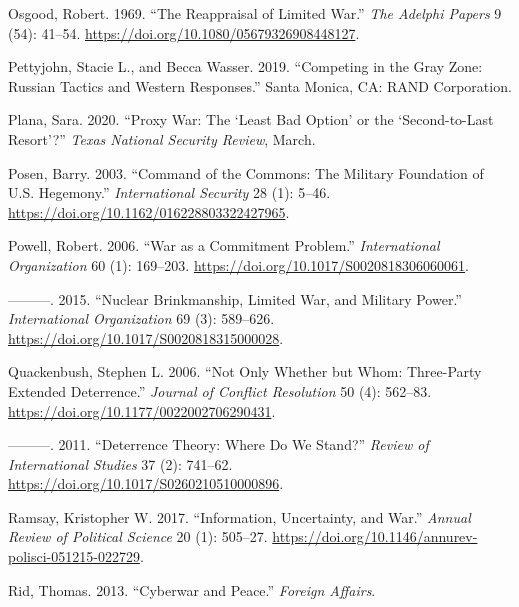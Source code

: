\documentclass[
]{article}
\begin{document}
\leavevmode\hypertarget{ref-osgood_reappraisallimitedwar_1969}{}%
Osgood, Robert. 1969. ``The Reappraisal of Limited War.'' \emph{The Adelphi Papers} 9 (54): 41--54. \url{https://doi.org/10.1080/05679326908448127}.

\leavevmode\hypertarget{ref-pettyjohn_competinggrayzone_2019}{}%
Pettyjohn, Stacie L., and Becca Wasser. 2019. ``Competing in the Gray Zone: Russian Tactics and Western Responses.'' Santa Monica, CA: RAND Corporation.

\leavevmode\hypertarget{ref-plana_proxywarleast_2020}{}%
Plana, Sara. 2020. ``Proxy War: The `Least Bad Option' or the `Second-to-Last Resort'?'' \emph{Texas National Security Review}, March.

\leavevmode\hypertarget{ref-posen_commandcommonsmilitary_2003}{}%
Posen, Barry. 2003. ``Command of the Commons: The Military Foundation of U.S. Hegemony.'' \emph{International Security} 28 (1): 5--46. \url{https://doi.org/10.1162/016228803322427965}.

\leavevmode\hypertarget{ref-powell_warcommitmentproblem_2006}{}%
Powell, Robert. 2006. ``War as a Commitment Problem.'' \emph{International Organization} 60 (1): 169--203. \url{https://doi.org/10.1017/S0020818306060061}.

\leavevmode\hypertarget{ref-powell_nuclearbrinkmanshiplimited_2015}{}%
---------. 2015. ``Nuclear Brinkmanship, Limited War, and Military Power.'' \emph{International Organization} 69 (3): 589--626. \url{https://doi.org/10.1017/S0020818315000028}.

\leavevmode\hypertarget{ref-quackenbush_notonlywhether_2006}{}%
Quackenbush, Stephen L. 2006. ``Not Only Whether but Whom: Three-Party Extended Deterrence.'' \emph{Journal of Conflict Resolution} 50 (4): 562--83. \url{https://doi.org/10.1177/0022002706290431}.

\leavevmode\hypertarget{ref-quackenbush_deterrencetheorywhere_2011}{}%
---------. 2011. ``Deterrence Theory: Where Do We Stand?'' \emph{Review of International Studies} 37 (2): 741--62. \url{https://doi.org/10.1017/S0260210510000896}.

\leavevmode\hypertarget{ref-ramsay_informationuncertaintywar_2017}{}%
Ramsay, Kristopher W. 2017. ``Information, Uncertainty, and War.'' \emph{Annual Review of Political Science} 20 (1): 505--27. \url{https://doi.org/10.1146/annurev-polisci-051215-022729}.

\leavevmode\hypertarget{ref-rid_cyberwarpeace_2013}{}%
Rid, Thomas. 2013. ``Cyberwar and Peace.'' \emph{Foreign Affairs}.
\end{document}
